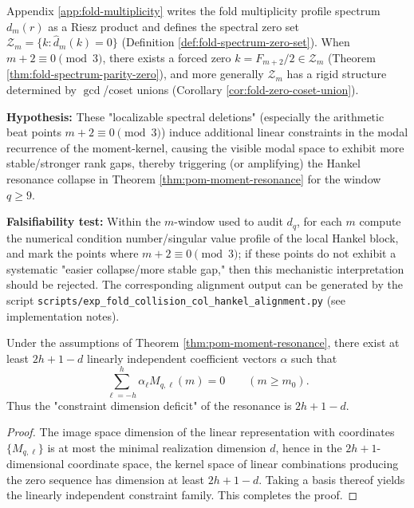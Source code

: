 \begin{conjecture}\label{conj:pom-fourier-zero-driven-resonance}
Appendix \ref{app:fold-multiplicity} writes the fold multiplicity profile spectrum \(d_m(r)\) as a Riesz product and defines the spectral zero set
\(
\mathcal{Z}_m=\{k:\widehat d_m(k)=0\}
\)
(Definition \ref{def:fold-spectrum-zero-set}). When \(m+2\equiv 0\pmod 3\), there exists a forced zero \(k=F_{m+2}/2\in\mathcal{Z}_m\) (Theorem \ref{thm:fold-spectrum-parity-zero}), and more generally \(\mathcal{Z}_m\) has a rigid structure determined by \(\gcd\)/coset unions (Corollary \ref{cor:fold-zero-coset-union}).
\par
\textbf{Hypothesis:} These "localizable spectral deletions" (especially the arithmetic beat points \(m+2\equiv 0\pmod 3\)) induce additional linear constraints in the modal recurrence of the moment-kernel, causing the visible modal space to exhibit more stable/stronger rank gaps, thereby triggering (or amplifying) the Hankel resonance collapse in Theorem \ref{thm:pom-moment-resonance} for the window \(q\ge 9\).
\par
\textbf{Falsifiability test:} Within the \(m\)-window used to audit \(d_q\), for each \(m\) compute the numerical condition number/singular value profile of the local Hankel block, and mark the points where \(m+2\equiv 0\pmod 3\); if these points do not exhibit a systematic "easier collapse/more stable gap," then this mechanistic interpretation should be rejected. The corresponding alignment output can be generated by the script \texttt{scripts/exp\_fold\_collision\_col\_hankel\_alignment.py} (see implementation notes).
\end{conjecture}



\begin{corollary}\label{cor:pom-resonance-deficit}
Under the assumptions of Theorem \ref{thm:pom-moment-resonance}, there exist at least
\(
2h+1-d
\)
linearly independent coefficient vectors $\alpha$ such that
\[
\sum_{\ell=-h}^{h}\alpha_\ell M_{q,\ell}(m)=0\qquad(m\ge m_0).
\]
Thus the "constraint dimension deficit" of the resonance is $2h+1-d$.
\end{corollary}
\begin{proof}
The image space dimension of the linear representation with coordinates $\{M_{q,\ell}\}$ is at most the minimal realization dimension $d$, hence in the $2h+1$-dimensional coordinate space, the kernel space of linear combinations producing the zero sequence has dimension at least $2h+1-d$. Taking a basis thereof yields the linearly independent constraint family. This completes the proof.
\end{proof}

